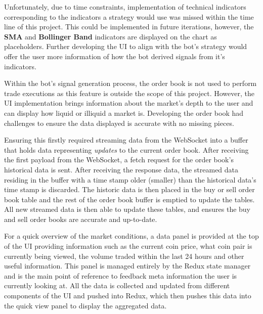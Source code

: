 Unfortunately, due to time constraints, implementation of technical indicators corresponding to the indicators a strategy would use was missed within the time line of this project. This could be implemented in future iterations, however, the \textbf{SMA} and \textbf{Bollinger Band} indicators are displayed on the chart as placeholders. Further developing the UI to align with the bot's strategy would offer the user more information of how the bot derived signals from it's indicators.

Within the bot's signal generation process, the order book is not used to perform trade executions as this feature is outside the scope of this project. However, the UI implementation brings information about the market's depth to the user and can display how liquid or illiquid a market is. Developing the order book had challenges to ensure the data displayed is accurate with no missing pieces.

Ensuring this firstly required streaming data from the WebSocket into a buffer that holds data representing \textit{updates} to the current order book. After receiving the first payload from the WebSocket, a fetch request for the order book's historical data is sent. After receiving the response data, the streamed data residing in the buffer with a time stamp older (smaller) than the historical data's time stamp is discarded. The historic data is then placed in the buy or sell order book table and the rest of the order book buffer is emptied to update the tables. All new streamed data is then able to update these tables, and ensures the buy and sell order books are accurate and up-to-date.

For a quick overview of the market conditions, a data panel is provided at the top of the UI providing information such as the current coin price, what coin pair is currently being viewed, the volume traded within the last 24 hours and other useful information. This panel is managed entirely by the Redux state manager and is the main point of reference to feedback meta information the user is currently looking at. All the data is collected and updated from different components of the UI and pushed into Redux, which then pushes this data into the quick view panel to display the aggregated data.

